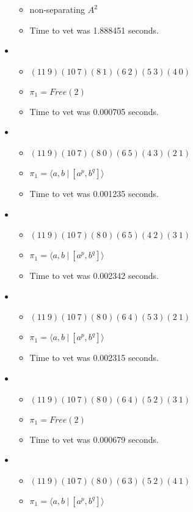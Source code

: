\documentclass{article}
\begin{document}
\begin{itemize}
\begin{itemize}
      \item non-separating $A^2$
      \item Time to vet was 1.888451 seconds.
\end{itemize}
\item \begin{itemize}
      \item $(11\ 9)(10\ 7)(8\ 1)(6\ 2)(5\ 3)(4\ 0)$
      \item $\pi_1 =Free(2)$
      \item Time to vet was 0.000705 seconds.
\end{itemize}
\item \begin{itemize}
      \item $(11\ 9)(10\ 7)(8\ 0)(6\ 5)(4\ 3)(2\ 1)$
      \item $\pi_1 = \langle a,b\ |\ [a^p,b^q]\rangle$
      \item Time to vet was 0.001235 seconds.
\end{itemize}
\item \begin{itemize}
      \item $(11\ 9)(10\ 7)(8\ 0)(6\ 5)(4\ 2)(3\ 1)$
      \item $\pi_1 = \langle a,b\ |\ [a^p,b^q]\rangle$
      \item Time to vet was 0.002342 seconds.
\end{itemize}
\item \begin{itemize}
      \item $(11\ 9)(10\ 7)(8\ 0)(6\ 4)(5\ 3)(2\ 1)$
      \item $\pi_1 = \langle a,b\ |\ [a^p,b^q]\rangle$
      \item Time to vet was 0.002315 seconds.
\end{itemize}
\item \begin{itemize}
      \item $(11\ 9)(10\ 7)(8\ 0)(6\ 4)(5\ 2)(3\ 1)$
      \item $\pi_1 =Free(2)$
      \item Time to vet was 0.000679 seconds.
\end{itemize}
\item \begin{itemize}
      \item $(11\ 9)(10\ 7)(8\ 0)(6\ 3)(5\ 2)(4\ 1)$
      \item $\pi_1 = \langle a,b\ |\ [a^p,b^q]\rangle$

\end{itemize}
\end{itemize}
\end{document}
